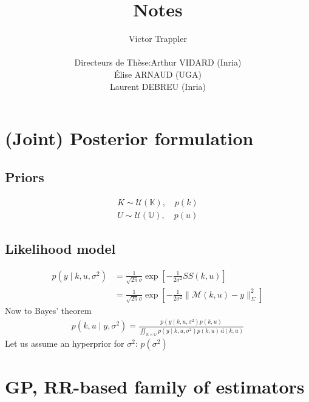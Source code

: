 \documentclass[a4paper,11pt]{article}
\begin{document}
\title{Notes}

\author{Victor Trappler \\[1cm]
  \begin{tabular}{lr}
    Directeurs de Thèse: & Arthur VIDARD (Inria) \\
                        & Élise ARNAUD (UGA)\\
                        & Laurent DEBREU (Inria)
  \end{tabular}
}

\maketitle
\tableofcontents
\section{(Joint) Posterior formulation}
\subsection{Priors}
\begin{align*}
  K \sim \mathcal{U}(\mathbb{K}), \quad p(k) \\
  U \sim \mathcal{U}(\mathbb{U}), \quad p(u)
\end{align*}
\subsection{Likelihood model}
\begin{align*}
  p(y \mid k, u, \sigma^2) &= \frac{1}{\sqrt{2\pi}\sigma}\exp\left[-\frac{1}{2\sigma^2}SS(k,u)\right] \\
                         &= \frac{1}{\sqrt{2\pi}\sigma}\exp\left[-\frac{1}{2\sigma^2} \|\mathcal{M}(k,u) - y \|^2_{\Sigma}\right]
\end{align*}
Now to Bayes' theorem
\begin{align*}
  p(k,u \mid y,\sigma^2) = \frac{p(y \mid k, u, \sigma^2) p(k,u)}{\iint_{\mathbb{K}\times\mathbb{U}}p(y \mid k, u, \sigma^2) p(k,u) \, \mathrm{d}(k,u)}
\end{align*}
Let us assume an hyperprior for $\sigma^2$: $p(\sigma^2)$

\newpage
\section{GP, RR-based family of estimators}
\end{document}
